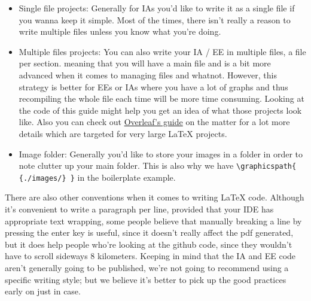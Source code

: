 \begin{itemize}
\item Single file projects: Generally for IAs you'd like to write it as a single file if you wanna keep it simple.
Most of the times, there isn't really a reason to write multiple files unless you know what you're doing.
\item Multiple files projects: You can also write your IA / EE in multiple files, a file per section.
meaning that you will have a main file and is a bit more advanced when it comes to managing files and whatnot.
However, this strategy is better for EEs or IAs where you have a lot of graphs
and thus recompiling the whole file each time will be more time consuming.
Looking at the code of this guide might help you get an idea of what those projects look like.
Also you can check out \href{https://www.overleaf.com/learn/latex/Multi-file_LaTeX_projects}{Overleaf's guide}
on the matter for a lot more details which are targeted for very large \LaTeX{} projects.
\item Image folder: Generally you'd like to store your images in a folder
in order to note clutter up your main folder.
This is also why we have \verb|\graphicspath{ {./images/} }| in the boilerplate example.
\end{itemize}

There are also other conventions when it comes to writing \LaTeX{} code.
Although it's convenient to write a paragraph per line, provided that your IDE has appropriate text wrapping,
some people believe that manually breaking a line by pressing the enter key is useful,
since it doesn't really affect the pdf generated,
but it does help people who're looking at the github code, since they wouldn't have to scroll sideways 8 kilometers.
Keeping in mind that the IA and EE code aren't generally going to be published,
we're not going to recommend using a specific writing style;
but we believe it's better to pick up the good practices early on just in case.


